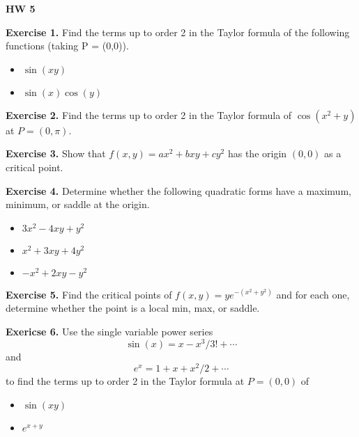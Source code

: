 \documentclass{article}
\begin{document}

\textbf{HW 5}

\textbf{Exercise 1.} Find the terms up to order 2 in the Taylor formula of the following functions
(taking P = (0,0)).
\begin{itemize}
    \item $\sin(xy)$
    \item $\sin(x)\cos(y)$
\end{itemize}

\textbf{Exercise 2.} Find the terms up to order 2 in the Taylor formula of
$\cos(x^2+y)$ at $P=(0,\pi)$.

\textbf{Exercise 3.} Show that $f(x,y) = ax^2 + bxy + cy^2$ has the origin $(0,0)$
as a critical point. 

\textbf{Exercise 4.} 
Determine whether the following quadratic forms have a maximum, minimum, or saddle at the origin.
\begin{itemize}
    \item $3x^2 - 4xy + y^2$
    \item $x^2 + 3xy + 4y^2$
    \item $-x^2 + 2xy - y^2$
\end{itemize}

\textbf{Exercise 5.} Find the critical points of $f(x,y) = ye^{-(x^2+y^2)}$
and for each one, determine whether the point is a local min, max, or saddle.

\textbf{Exericse 6.} Use the single variable power series
\[\sin(x) = x - x^3/3! + \cdots\]
and
\[e^{x} = 1 + x + x^2/2 + \cdots\]
to find the terms up to order 2 in the Taylor formula at $P=(0,0)$ of 
\begin{itemize}
    \item $\sin(xy)$
    \item $e^{x+y}$
\end{itemize}
\end{document}
